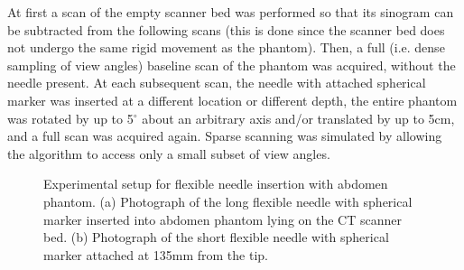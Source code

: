 At first a scan of the empty scanner bed was performed so that its sinogram can be subtracted from the following scans (this is done since the scanner bed does not undergo the same rigid movement as the phantom). Then, a full (i.e. dense sampling of view angles) baseline scan of the phantom was acquired, without the needle present. At each subsequent scan, the needle with attached spherical marker was inserted at a different location or different depth, the entire phantom was rotated by up to 5$^\circ$ about an arbitrary axis and/or translated by up to 5cm, and a full scan was acquired again. Sparse scanning was simulated by allowing the algorithm to access only a small subset of view angles.





\begin{figure}[t]
  \centering
  \hfill
  \caption{\small{Experimental setup for flexible needle insertion with abdomen phantom. (a) Photograph of the long flexible needle with spherical marker inserted into abdomen phantom lying on the CT scanner bed. (b) Photograph of the short flexible needle with spherical marker attached at 135mm from the tip.}}
    \label{fig:figures/fractional}
\end{figure}



